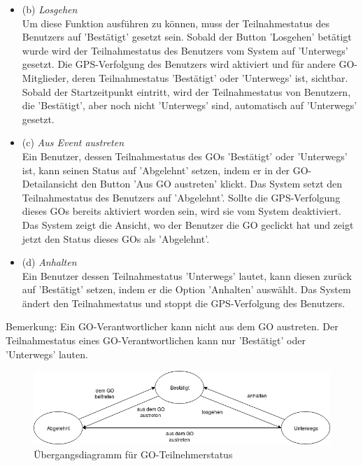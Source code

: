 \documentclass[parskip=full]{scrartcl}
\def\threedigits#1{%
  \ifnum#1<100 0\fi
  \ifnum#1<10 0\fi
  \number#1}
\begin{document}
\begin{enumerate}[label={\textbf{/F\protect\threedigits{\theenumi}0/}}, leftmargin=*, resume]
\begin{itemize}
	\item (b) \textit{Losgehen}\label{losgehen} \\
	Um diese Funktion ausführen zu können, muss der Teilnahmestatus des Benutzers auf 'Bestätigt' gesetzt sein. Sobald der Button 'Losgehen' betätigt wurde wird der Teilnahmestatus des Benutzers vom System auf 'Unterwegs' gesetzt. Die GPS-Verfolgung des Benutzers wird aktiviert und für andere GO-Mitglieder, deren Teilnahmestatus 'Bestätigt' oder 'Unterwegs' ist, sichtbar. Sobald der Startzeitpunkt eintritt, wird der Teilnahmestatus von Benutzern, die 'Bestätigt', aber noch nicht 'Unterwegs' sind, automatisch auf 'Unterwegs' gesetzt.
	
	\item (c) \textit{Aus Event austreten}\label{austreten} \\
Ein Benutzer, dessen Teilnahmestatus des GOs 'Bestätigt' oder 'Unterwegs' ist, kann seinen Status auf 'Abgelehnt' setzen, indem er in der GO-Detailansicht den Button 'Aus GO austreten' klickt. Das System setzt den Teilnahmestatus des Benutzers auf 'Abgelehnt'. Sollte die GPS-Verfolgung dieses GOs bereits aktiviert worden sein, wird sie vom System deaktiviert. Das System zeigt die Ansicht, wo der Benutzer die GO geclickt hat und zeigt jetzt den Status dieses GOs als 'Abgelehnt'.
	
	\item (d) \textit{Anhalten}\label{anhalten} \\
	Ein Benutzer dessen Teilnahmestatus 'Unterwegs' lautet, kann diesen zurück auf 'Bestätigt' setzen, indem er die Option 'Anhalten' auswählt. Das System ändert den Teilnahmestatus und stoppt die GPS-Verfolgung des Benutzers.
	
	\end{itemize}
	
	Bemerkung: Ein GO-Verantwortlicher kann nicht aus dem GO austreten. Der Teilnahmestatus eines GO-Verantwortlichen kann nur 'Bestätigt' oder 'Unterwegs' lauten.\\
	
	\begin{figure}[H]
		\centering
			\includegraphics[scale=0.55]{res/Teilnahmestatus.png}
		\caption{Übergangsdiagramm für GO-Teilnehmerstatus}	
	\end{figure}
	

\end{enumerate}
\end{document}
